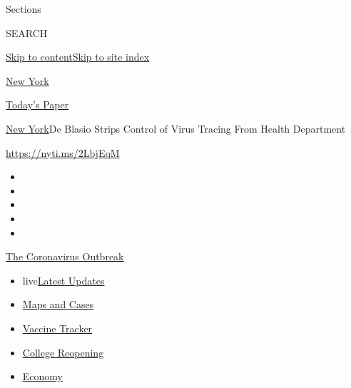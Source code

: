 Sections

SEARCH

\protect\hyperlink{site-content}{Skip to
content}\protect\hyperlink{site-index}{Skip to site index}

\href{https://www.nytimes3xbfgragh.onion/section/nyregion}{New York}

\href{https://myaccount.nytimes3xbfgragh.onion/auth/login?response_type=cookie\&client_id=vi}{}

\href{https://www.nytimes3xbfgragh.onion/section/todayspaper}{Today's
Paper}

\href{/section/nyregion}{New York}\textbar{}De Blasio Strips Control of
Virus Tracing From Health Department

\url{https://nyti.ms/2LbjEqM}

\begin{itemize}
\item
\item
\item
\item
\item
\end{itemize}

\href{https://www.nytimes3xbfgragh.onion/news-event/coronavirus?action=click\&pgtype=Article\&state=default\&region=TOP_BANNER\&context=storylines_menu}{The
Coronavirus Outbreak}

\begin{itemize}
\tightlist
\item
  live\href{https://www.nytimes3xbfgragh.onion/2020/08/04/world/coronavirus-cases.html?action=click\&pgtype=Article\&state=default\&region=TOP_BANNER\&context=storylines_menu}{Latest
  Updates}
\item
  \href{https://www.nytimes3xbfgragh.onion/interactive/2020/us/coronavirus-us-cases.html?action=click\&pgtype=Article\&state=default\&region=TOP_BANNER\&context=storylines_menu}{Maps
  and Cases}
\item
  \href{https://www.nytimes3xbfgragh.onion/interactive/2020/science/coronavirus-vaccine-tracker.html?action=click\&pgtype=Article\&state=default\&region=TOP_BANNER\&context=storylines_menu}{Vaccine
  Tracker}
\item
  \href{https://www.nytimes3xbfgragh.onion/2020/08/02/us/covid-college-reopening.html?action=click\&pgtype=Article\&state=default\&region=TOP_BANNER\&context=storylines_menu}{College
  Reopening}
\item
  \href{https://www.nytimes3xbfgragh.onion/live/2020/08/04/business/stock-market-today-coronavirus?action=click\&pgtype=Article\&state=default\&region=TOP_BANNER\&context=storylines_menu}{Economy}
\end{itemize}

